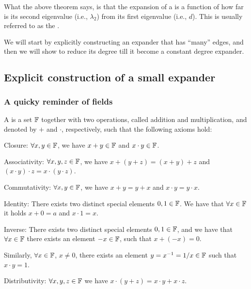 What the above theorem says, is that the expansion of a
 is a function of how far is its second
eigenvalue (i.e., $\lambda_2$) from its first eigenvalue (i.e.,
$d$). This is usually referred to as the .

We will start by explicitly constructing an expander that has ``many''
edges, and then we will show to reduce its degree till it become a
constant degree expander.



\subsection{Explicit construction of a small expander}

\subsubsection{A quicky reminder of fields}

A  is a set $\mathbb{F}$ together with two operations, called
addition and multiplication, and denoted by $+$ and $\cdot$,
respectively, such that the following axioms hold:
\begin{compactenumi}
    \item Closure: $\forall x,y \in \mathbb{F}$, we have $x+y \in \mathbb{F}$
    and $x\cdot y \in \mathbb{F}$.

    \item Associativity: $\forall x,y,z \in \mathbb{F}$, we have $x+(y+z)
    = (x+y)+z$ and $(x \cdot y ) \cdot z =x \cdot (y\cdot z)$.

    \item Commutativity: $\forall x,y \in \mathbb{F}$, we have $x+y = y+x$
    and $x\cdot y = y\cdot x$.

    \item Identity: There exists two distinct special elements $0,1
    \in \mathbb{F}$. We have that $\forall x \in \mathbb{F}$ it holds $x+0 =
    a$ and $x\cdot 1 = x$.

    \item Inverse: There exists two distinct special elements $0,1
    \in \mathbb{F}$, and we have that $\forall x \in \mathbb{F}$ there exists an
    element $-x \in \mathbb{F}$, such that $x+ (-x)=0$.

    Similarly, $\forall x \in \mathbb{F}$, $x \ne 0$, there exists an
    element $y= x^{-1} = 1/x \in \mathbb{F}$ such that $x \cdot y = 1$.

    \item Distributivity: $\forall x,y,z \in \mathbb{F}$ we have
    $x\cdot(y+z) = x\cdot y + x\cdot z$.
\end{compactenumi}


